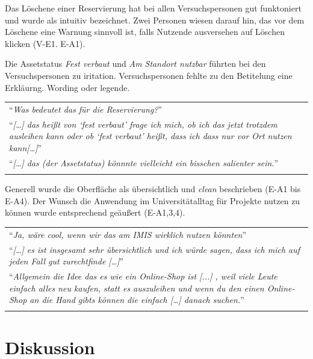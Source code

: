 Das Löschene einer Reservierung hat bei allen Versuchspersonen gut funktoniert und wurde als
intuitiv bezeichnet. Zwei Personen wiesen darauf hin, das vor dem Löschene eine Warnung sinnvoll ist,
falls Nutzende ausversehen auf Löschen klicken (V-E1. E-A1). 

Die Assetstatus \textit{Fest verbaut} und \textit{Am Standort nutzbar} führten bei den
Versuchspersonen zu iritation. Versuchspersonen fehlte zu den Betitelung eine Erkläurng.  Wording
oder legende.

\begin{longtable}{p{}} \arrayrulecolor{maincolor}\hline
  \enquote{\textit{Was bedeutet das für die Reservierung?}} \\
  \enquote{\textit{[\dots] das heißt von \enquote{fest verbaut} frage ich mich, ob ich das jetzt
  trotzdem ausleihen kann oder ob \enquote{fest verbaut} heißt, dass ich dass nur vor Ort nutzen
  kann[\dots]}} \\
  \enquote{\textit{[\dots] das (der Assetstatus) könnnte vielleicht ein bisschen salienter sein.}}
  \\
  \arrayrulecolor{maincolor}\hline
\end{longtable}

Generell wurde die Oberfläche als übersichtlich und \textit{clean} beschrieben (E-A1 bis E-A4). Der
Wunsch die Anwendung im Universitätalltag für Projekte nutzen zu können wurde entsprechend geäußert
(E-A1,3,4).

\begin{longtable}{p{}} \arrayrulecolor{maincolor}\hline
  \enquote{\textit{Ja, wäre cool, wenn wir das am IMIS wirklich nutzen könnten}}\\
  \enquote{\textit{[\dots] es ist insgesamt sehr übersichtlich und ich würde sagen, dass ich mich
  auf jeden Fall gut zurechtfinde [\dots]}} \\
  \enquote{\textit{Allgemein die Idee das es wie ein Online-Shop ist [...] , weil viele Leute
  einfach alles neu kaufen, statt es auszuleihen und wenn du den einen Online-Shop an die Hand gibts
  können die einfach [\dots] danach suchen.}} \\
  \arrayrulecolor{maincolor}\hline
\end{longtable}


\section{Diskussion}